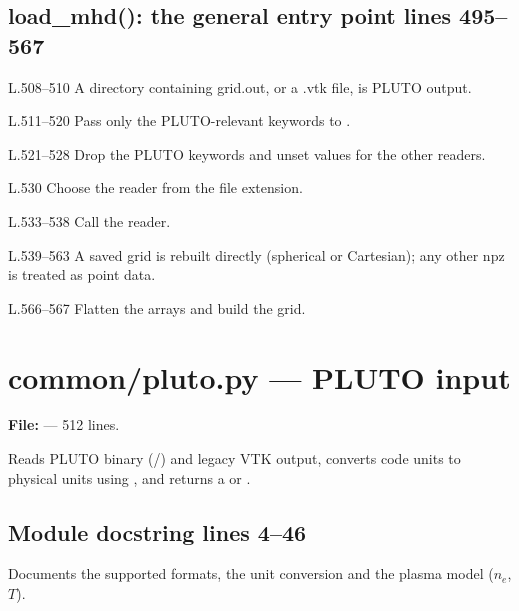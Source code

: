 \section*{\normalsize load\_mhd(): the general entry point \hfill{\small\mdseries\color{gray}lines 495--567}}

\begin{lines}
\item[L.508–510] A directory containing grid.out, or a .vtk file, is PLUTO output.
\item[L.511–520] Pass only the PLUTO-relevant keywords to .
\item[L.521–528] Drop the PLUTO keywords and unset values for the other readers.
\item[L.530] Choose the reader from the file extension.
\item[L.533–538] Call the reader.
\item[L.539–563] A saved grid is rebuilt directly (spherical or Cartesian); any other npz is treated as point data.
\item[L.566–567] Flatten the arrays and build the grid.
\end{lines}

\chapter{common/pluto.py --- PLUTO input}
\label{mod:common:pluto.py}
\textbf{File:}  --- 512 lines.

Reads PLUTO binary (/) and legacy VTK output, converts code units to
physical units using , and returns a  or .

\section*{\normalsize Module docstring \hfill{\small\mdseries\color{gray}lines 4--46}}

Documents the supported formats, the unit conversion and the plasma model ($n_e$, $T$).

